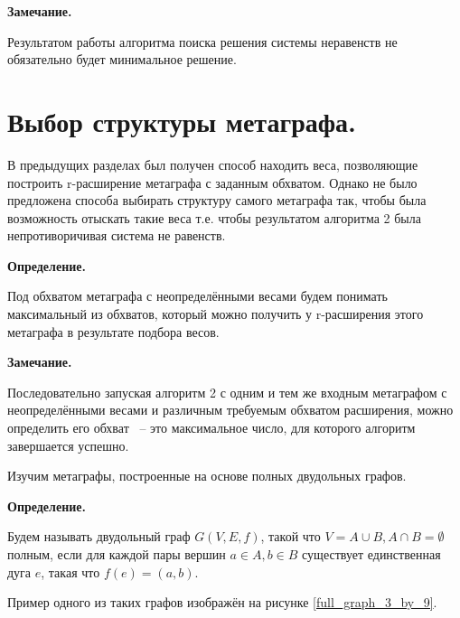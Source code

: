 \documentclass[14pt]{mmcs-article}
\begin{document}
\textbf{Замечание.}

Результатом работы алгоритма поиска решения системы неравенств не обязательно будет минимальное решение.


\section{Выбор структуры метаграфа.}

В предыдущих разделах был получен способ находить веса, позволяющие построить r-расширение метаграфа с заданным обхватом. Однако не было предложена способа выбирать структуру самого метаграфа так, чтобы была возможность отыскать такие веса т.е. чтобы результатом алгоритма 2 была непротиворичивая система не равенств.

\textbf{Определение.}

Под обхватом метаграфа с неопределёнными весами будем понимать максимальный из обхватов, который можно получить у r-расширения этого метаграфа в результате подбора весов.

\textbf{Замечание.}

Последовательно запуская алгоритм 2 с одним и тем же входным метаграфом с неопределёнными весами и различным требуемым обхватом расширения, можно определить его обхват ~-- это максимальное число, для которого алгоритм завершается успешно.

Изучим метаграфы, построенные на основе полных двудольных графов. 

\textbf{Определение.}

Будем называть двудольный граф $G(V,E,f)$, такой что $V = A \cup B, A \cap B = \emptyset$ полным, если для каждой пары вершин $a \in A, b \in B$ существует единственная дуга $e$, такая что $f(e) = (a, b)$.

Пример одного из таких графов изображён на рисунке \ref{full_graph_3_by_9}. 
\end{document}
